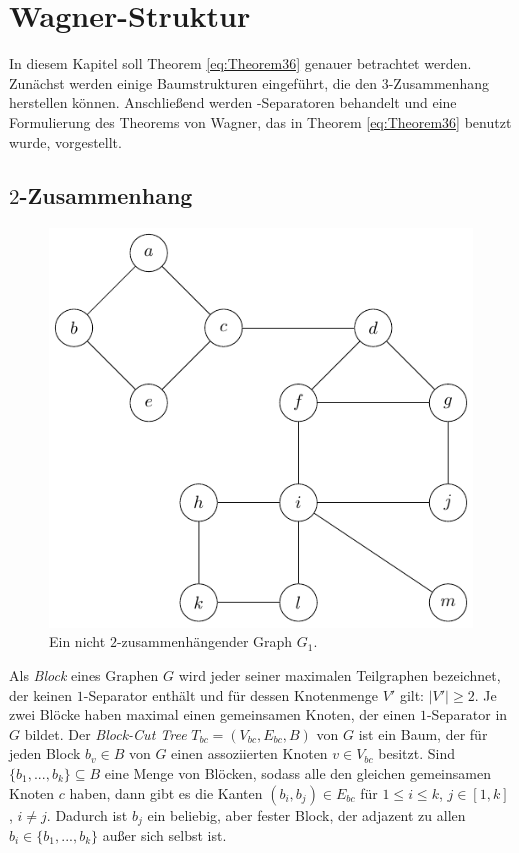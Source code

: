 \chapter{Wagner-Struktur}
\label{cha:wagnerstruktur}

In diesem Kapitel soll Theorem \ref{eq:Theorem36} genauer betrachtet werden.
Zunächst werden einige Baumstrukturen eingeführt, die den $3$-Zusammenhang herstellen können.
Anschließend werden \dd-Separatoren behandelt und eine Formulierung des Theorems von Wagner, das in Theorem \ref{eq:Theorem36} benutzt wurde, vorgestellt.

\section{$2$-Zusammenhang}

\begin{figure}[H]
  \centering
  \includegraphics[width=\textwidth,height=\textheight,keepaspectratio]{bilder/1-Block-Tree1.pdf}
  \caption{Ein nicht $2$-zusammenhängender Graph $G_1$.}
  \label{fig:1-Block-Tree1}
\end{figure}
\begin{definition}
  Als \emph{Block} eines Graphen $G$ wird jeder seiner maximalen Teilgraphen bezeichnet, der keinen $1$-Separator enthält und für dessen Knotenmenge $V'$ gilt: $\vert V' \vert \geq 2$.
  Je zwei Blöcke haben maximal einen gemeinsamen Knoten, der einen $1$-Separator in $G$ bildet.
  Der \emph{Block-Cut Tree} $T_{bc} = (V_{bc}, E_{bc}, B)$ von $G$ ist ein Baum, der für jeden Block $b_v \in B$ von $G$ einen assoziierten Knoten $v \in V_{bc}$ besitzt.
  Sind $\{b_1, ..., b_k\} \subseteq B$ eine Menge von Blöcken, sodass alle den gleichen gemeinsamen Knoten $c$ haben, dann gibt es die Kanten $(b_i, b_j) \in E_{bc}$ für $1 \leq i \leq k$, $j \in [1, k]$, $i \neq j$.
  Dadurch ist $b_j$ ein beliebig, aber fester Block, der adjazent zu allen $b_i \in \{b_1, ..., b_k\}$ außer sich selbst ist.
\end{definition}
